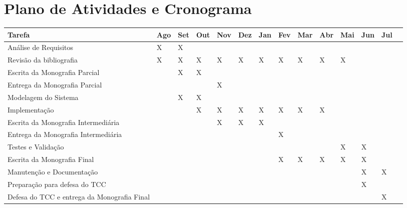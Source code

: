 \documentclass[tcc-proposta]{texufpel}
\begin{document}

\chapter{Plano de Atividades e Cronograma}

\begin{center}
\begin{tabular}{ | m{3.6cm} | m{0.65cm}| m{0.65cm} | m{0.65cm} | m{0.65cm} | m{0.65cm} | m{0.65cm} | m{0.65cm} | m{0.65cm} | m{0.65cm} | m{0.65cm} | m{0.65cm} | m{0.65cm} | m{0.65cm} | } 
  \hline
   Tarefa & Ago & Set & Out & Nov & Dez & Jan & Fev & Mar & Abr & Mai & Jun & Jul  \\ 
  \hline
  Análise de Requisitos & X & X & & & & & & & & & & \\
  \hline 
  Revisão da bibliografia & X & X & X & X & X & X & X & X & X & X & &\\
  \hline
  Escrita da Monografia Parcial & & X & X & & & & & & & & & \\
  \hline
  Entrega da Monografia Parcial & & & & X & & & & & & & & \\
  \hline
  Modelagem do Sistema & & X & X & & & & & & & & & \\
  \hline
  Implementação & & & X & X & X & X & X & X & X & & & \\
  \hline
  Escrita da Monografia Intermediária & & & & X & X & X & & & & & & \\
  \hline
  Entrega da Monografia Intermediária & & & & & & & X & & & & & \\
  \hline
  Testes e Validação & & & & & & & & & & X & X & \\
  \hline
  Escrita da Monografia Final & & & & & & & X & X & X & X & X & \\
  \hline
  Manutenção e Documentação & & & & & & & & & & & X & X\\
  \hline
  Preparação para defesa do TCC & & & & & & & & & & & X & \\
  \hline
  Defesa do TCC e entrega da Monografia Final & & & & & & & & & & & & X \\
  \hline
\end{tabular}
\end{center}




\end{document}
